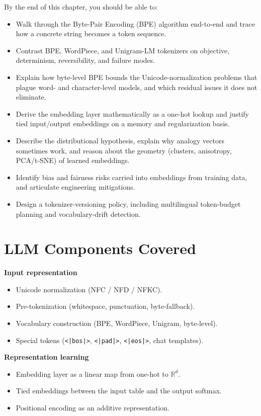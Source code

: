 By the end of this chapter, you should be able to:
\begin{itemize}
  \item Walk through the Byte-Pair Encoding (BPE) algorithm end-to-end
        and trace how a concrete string becomes a token sequence.
  \item Contrast BPE, WordPiece, and Unigram-LM tokenizers on
        objective, determinism, reversibility, and failure modes.
  \item Explain how byte-level BPE bounds the Unicode-normalization
        problems that plague word- and character-level models, and
        which residual issues it does not eliminate.
  \item Derive the embedding layer mathematically as a one-hot lookup
        and justify tied input/output embeddings on a memory and
        regularization basis.
  \item Describe the distributional hypothesis, explain why analogy
        vectors sometimes work, and reason about the geometry
        (clusters, anisotropy, PCA/t-SNE) of learned embeddings.
  \item Identify bias and fairness risks carried into embeddings from
        training data, and articulate engineering mitigations.
  \item Design a tokenizer-versioning policy, including multilingual
        token-budget planning and vocabulary-drift detection.
\end{itemize}

\section{LLM Components Covered}

\textbf{Input representation}
\begin{itemize}
  \item Unicode normalization (NFC / NFD / NFKC).
  \item Pre-tokenization (whitespace, punctuation, byte-fallback).
  \item Vocabulary construction (BPE, WordPiece, Unigram, byte-level).
  \item Special tokens (\texttt{<|bos|>}, \texttt{<|pad|>},
        \texttt{<|eos|>}, chat templates).
\end{itemize}

\textbf{Representation learning}
\begin{itemize}
  \item Embedding layer as a linear map from one-hot to $\mathbb{R}^d$.
  \item Tied embeddings between the input table and the output softmax.
  \item Positional encoding as an additive representation.
\end{itemize}

